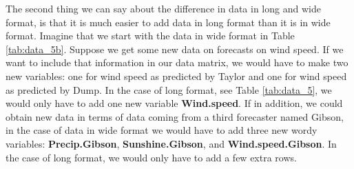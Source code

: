 \documentclass[]{book}\usepackage[]{graphicx}\usepackage[]{color}
\begin{document}
The second thing we can say about the difference in data in long and wide format, is that it is much easier to add data in long format than it is in wide format. Imagine that we start with the data in wide format in Table \ref{tab:data_5b}. Suppose we get some new data on forecasts on wind speed. If we want to include that information in our data matrix, we would have to make two new variables: one for wind speed as predicted by Taylor and one for wind speed as predicted by Dump. In the case of long format, see Table \ref{tab:data_5}, we would only have to add one new variable \textbf{Wind.speed}. If in addition, we could obtain new data in terms of data coming from a third forecaster named Gibson, in the case of data in wide format we would have to add three new wordy variables: \textbf{Precip.Gibson}, \textbf{Sunshine.Gibson}, and \textbf{Wind.speed.Gibson}. In the case of long format, we would only have to add a few extra rows.
\end{document}

